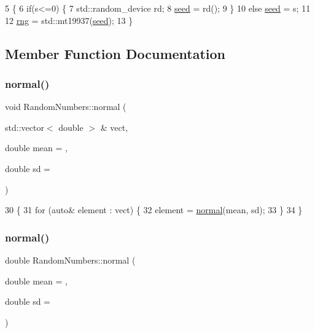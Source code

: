 \begin{DoxyCode}
5 \{
6     \textcolor{keywordflow}{if}(s<=0) \{
7         std::random\_device rd;
8         \hyperlink{classRandomNumbers_a83c563bc5ca60f2e5c149244b327d948}{seed} = rd();
9         \}
10     \textcolor{keywordflow}{else} \hyperlink{classRandomNumbers_a83c563bc5ca60f2e5c149244b327d948}{seed} = s;
11         
12     \hyperlink{classRandomNumbers_a15ceee85d6d00de12ae76c90aaec2f14}{rng} = std::mt19937(\hyperlink{classRandomNumbers_a83c563bc5ca60f2e5c149244b327d948}{seed});
13 \}
\end{DoxyCode}


\subsection{Member Function Documentation}
\mbox{\label{classRandomNumbers_a4ef5917200da65aa267735d389bdf995}} 
\subsubsection{\texorpdfstring{normal()}{normal()}\hspace{0.1cm}{\footnotesize\ttfamily [1/2]}}
{\footnotesize\ttfamily void Random\+Numbers\+::normal (\begin{DoxyParamCaption}\item[{std\+::vector$<$ double $>$ \&}]{vect,  }\item[{double}]{mean = {},  }\item[{double}]{sd = {} }\end{DoxyParamCaption})}


\begin{DoxyCode}
30 \{
31     \textcolor{keywordflow}{for} (\textcolor{keyword}{auto}& element : vect) \{
32         element = \hyperlink{classRandomNumbers_a4ef5917200da65aa267735d389bdf995}{normal}(mean, sd);
33     \}
34 \}
\end{DoxyCode}
\mbox{\label{classRandomNumbers_abbfcbae72e7dbd048567dd5b8e2ce9d2}} 
\subsubsection{\texorpdfstring{normal()}{normal()}\hspace{0.1cm}{\footnotesize\ttfamily [2/2]}}
{\footnotesize\ttfamily double Random\+Numbers\+::normal (\begin{DoxyParamCaption}\item[{double}]{mean = {},  }\item[{double}]{sd = {} }\end{DoxyParamCaption})}


